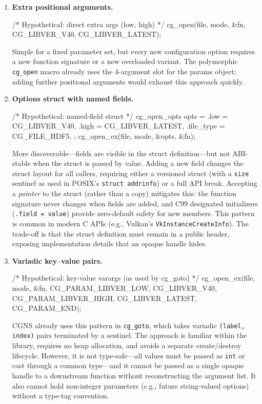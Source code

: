 \documentclass[11pt,letterpaper]{article}
\makeatletter
\let\cgns@orig@lstlisting\lstlisting
\let\cgns@endorig@lstlisting\endlstlisting
\renewenvironment{lstlisting}
  {\par\needspace{5\baselineskip}\nolinenumbers\cgns@orig@lstlisting}
  {\cgns@endorig@lstlisting\par\linenumbers}
\makeatother
\begin{document}
\begin{enumerate}[leftmargin=2em]

\item \textbf{Extra positional arguments.}
\begin{lstlisting}[language=C]
/* Hypothetical: direct extra args (low, high) */
cg_open(file, mode, &fn,
        CG_LIBVER_V40, CG_LIBVER_LATEST);
\end{lstlisting}
Simple for a fixed parameter set, but every new configuration option
requires a new function signature or a new overloaded variant.  The
polymorphic \texttt{cg\_open} macro already uses the 4-argument slot
for the params object; adding further positional arguments would
exhaust this approach quickly.

\item \textbf{Options struct with named fields.}
\begin{lstlisting}[language=C]
/* Hypothetical: named-field struct */
cg_open_opts opts = {
    .low       = CG_LIBVER_V40,
    .high      = CG_LIBVER_LATEST,
    .file_type = CG_FILE_HDF5,
};
cg_open_ex(file, mode, &opts, &fn);
\end{lstlisting}
More discoverable---fields are visible in the struct definition---but
not ABI-stable when the struct is passed by value.  Adding a new field
changes the struct layout for all callers, requiring either a versioned
struct (with a \texttt{size} sentinel as used in POSIX's
\texttt{struct addrinfo}) or a full API break.  Accepting a
\emph{pointer} to the struct (rather than a copy) mitigates this: the
function signature never changes when fields are added, and C99
designated initializers (\texttt{.field = value}) provide zero-default
safety for new members.  This pattern is common in modern C APIs
(e.g., Vulkan's \texttt{VkInstanceCreateInfo}).  The trade-off is that
the struct definition must remain in a public header, exposing
implementation details that an opaque handle hides.

\item \textbf{Variadic key--value pairs.}
\begin{lstlisting}[language=C]
/* Hypothetical: key-value varargs (as used by cg_goto) */
cg_open_ex(file, mode, &fn,
           CG_PARAM_LIBVER_LOW,  CG_LIBVER_V40,
           CG_PARAM_LIBVER_HIGH, CG_LIBVER_LATEST,
           CG_PARAM_END);
\end{lstlisting}
CGNS already uses this pattern in \texttt{cg\_goto}, which takes
variadic \texttt{(label, index)} pairs terminated by a sentinel.
The approach is familiar within the library, requires no heap
allocation, and avoids a separate create/destroy lifecycle.  However,
it is not type-safe---all values must be passed as \texttt{int} or
cast through a common type---and it cannot be passed as a single
opaque handle to a downstream function without reconstructing the
argument list.  It also cannot hold non-integer parameters (e.g.,
future string-valued options) without a type-tag convention.


\end{enumerate}
\end{document}
